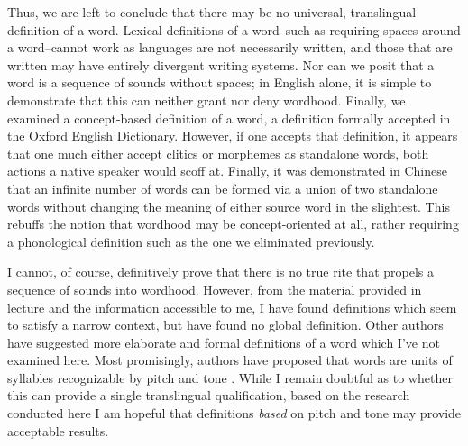 \documentclass{article}
\begin{document}
Thus, we are left to conclude that there may be no universal, translingual definition of a word. Lexical definitions of a word--such as requiring spaces around a word--cannot work as languages are not necessarily written, and those that are written may have entirely divergent writing systems. Nor can we posit that a word is a sequence of sounds without spaces; in English alone, it is simple to demonstrate that this can neither grant nor deny wordhood. Finally, we examined a concept-based definition of a word, a definition formally accepted in the Oxford English Dictionary. However, if one accepts that definition, it appears that one much either accept clitics or morphemes as standalone words, both actions a native speaker would scoff at. Finally, it was demonstrated in Chinese that an infinite number of words can be formed via a union of two standalone words without changing the meaning of either source word in the slightest. This rebuffs the notion that wordhood may be concept-oriented at all, rather requiring a phonological definition such as the one we eliminated previously.

I cannot, of course, definitively prove that there is no true rite that propels a sequence of sounds into wordhood. However, from the material provided in lecture and the information accessible to me, I have found definitions which seem to satisfy a narrow context, but have found no global definition. Other authors have suggested more elaborate and formal definitions of a word which I've not examined here. Most promisingly, authors have proposed that words are units of syllables recognizable by pitch and tone \cite{driver1989music}. While I remain doubtful as to whether this can provide a single translingual qualification, based on the research conducted here I am hopeful that definitions \textit{based} on pitch and tone may provide acceptable results.

\medskip

\printbibliography
\end{document}

